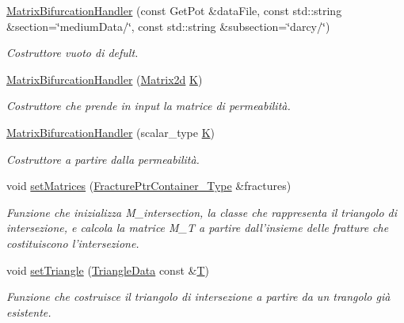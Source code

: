 \begin{DoxyCompactItemize}
\item 
\hyperlink{classMatrixBifurcationHandler_a57f9791749acd9b699bf737193c2e87a}{Matrix\-Bifurcation\-Handler} (const Get\-Pot \&data\-File, const std\-::string \&section=\char`\"{}medium\-Data/\char`\"{}, const std\-::string \&subsection=\char`\"{}darcy/\char`\"{})
\begin{DoxyCompactList}\small\item\em Costruttore vuoto di defult. \end{DoxyCompactList}\item 
\hyperlink{classMatrixBifurcationHandler_ad65c01c578ef41e0513e6915cadb068e}{Matrix\-Bifurcation\-Handler} (\hyperlink{Core_8h_a1694976dd66ed00e5f0618f4f8821163}{Matrix2d} \hyperlink{classMatrixBifurcationHandler_ac7d63c6d730079862dd8238928d94b26}{K})
\begin{DoxyCompactList}\small\item\em Costruttore che prende in input la matrice di permeabilità. \end{DoxyCompactList}\item 
\hyperlink{classMatrixBifurcationHandler_a86e7580758aa9a2ec5ef4285e70d06bf}{Matrix\-Bifurcation\-Handler} (scalar\-\_\-type \hyperlink{classMatrixBifurcationHandler_ac7d63c6d730079862dd8238928d94b26}{K})
\begin{DoxyCompactList}\small\item\em Costruttore a partire dalla permeabilità. \end{DoxyCompactList}\item 
void \hyperlink{classMatrixBifurcationHandler_a94433cf28ec2af6ba06b7f63a081d787}{set\-Matrices} (\hyperlink{FractureHandler_8h_a2f0b57e18ecf89912d7de0c87158009e}{Fracture\-Ptr\-Container\-\_\-\-Type} \&fractures)
\begin{DoxyCompactList}\small\item\em Funzione che inizializza M\-\_\-intersection, la classe che rappresenta il triangolo di intersezione, e calcola la matrice M\-\_\-\-T a partire dall'insieme delle fratture che costituiscono l'intersezione. \end{DoxyCompactList}\item 
void \hyperlink{classMatrixBifurcationHandler_aa7e601bac77856cac8db77c58023c1b4}{set\-Triangle} (\hyperlink{classTriangleData}{Triangle\-Data} const \&\hyperlink{classMatrixBifurcationHandler_a3b7305f6106add811e7b4b69f5642e86}{T})
\begin{DoxyCompactList}\small\item\em Funzione che costruisce il triangolo di intersezione a partire da un trangolo già esistente. \end{DoxyCompactList}\item 

\end{DoxyCompactItemize}
